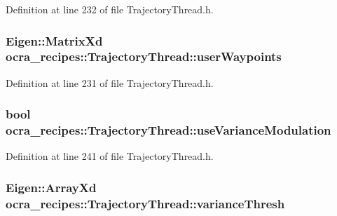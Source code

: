 Definition at line 232 of file Trajectory\+Thread.\+h.

\subsubsection[{\texorpdfstring{user\+Waypoints}{userWaypoints}}]{\setlength{\rightskip}{0pt plus 5cm}Eigen\+::\+Matrix\+Xd ocra\+\_\+recipes\+::\+Trajectory\+Thread\+::user\+Waypoints\hspace{0.3cm}{\ttfamily [protected]}}\hypertarget{classocra__recipes_1_1TrajectoryThread_a54a762b3cdd7330322b39f288deda6a9}{}\label{classocra__recipes_1_1TrajectoryThread_a54a762b3cdd7330322b39f288deda6a9}


Definition at line 231 of file Trajectory\+Thread.\+h.

\subsubsection[{\texorpdfstring{use\+Variance\+Modulation}{useVarianceModulation}}]{\setlength{\rightskip}{0pt plus 5cm}bool ocra\+\_\+recipes\+::\+Trajectory\+Thread\+::use\+Variance\+Modulation\hspace{0.3cm}{\ttfamily [protected]}}\hypertarget{classocra__recipes_1_1TrajectoryThread_a963041d784e1078db6a3095a0438a129}{}\label{classocra__recipes_1_1TrajectoryThread_a963041d784e1078db6a3095a0438a129}


Definition at line 241 of file Trajectory\+Thread.\+h.

\subsubsection[{\texorpdfstring{variance\+Thresh}{varianceThresh}}]{\setlength{\rightskip}{0pt plus 5cm}Eigen\+::\+Array\+Xd ocra\+\_\+recipes\+::\+Trajectory\+Thread\+::variance\+Thresh\hspace{0.3cm}{\ttfamily [protected]}}\hypertarget{classocra__recipes_1_1TrajectoryThread_a63dbf38d082f3ebcebaee867dba2a8ee}{}\label{classocra__recipes_1_1TrajectoryThread_a63dbf38d082f3ebcebaee867dba2a8ee}


